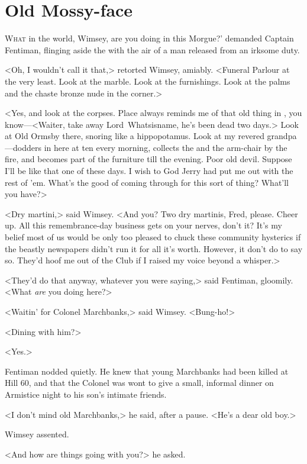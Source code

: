 \chapter{Old Mossy-face}
\lettrine[ante=‘]{W}{hat} in the world, Wimsey, are you doing in this  Morgue?' demanded Captain Fentiman, flinging aside the  with the air of a man released from an irksome duty.

\zz
<Oh, I wouldn't call it that,> retorted Wimsey, amiably. <Funeral Parlour at the very least. Look at the marble. Look at the furnishings. Look at the palms and the chaste bronze nude in the corner.>

<Yes, and look at the corpses. Place always reminds me of that old thing in , you know—<Waiter, take away Lord~Whatsisname, he's been dead two days.> Look at Old Ormsby there, snoring like a hippopotamus. Look at my revered grandpa—dodders in here at ten every morning, collects the  and the arm-chair by the fire, and becomes part of the furniture till the evening. Poor old devil. Suppose I'll be like that one of these days. I wish to God Jerry had put me out with the rest of 'em. What's the good of coming through for this sort of thing? What'll you have?>

<Dry martini,> said Wimsey. <And you? Two dry martinis, Fred, please. Cheer up. All this remembrance-day business gets on your nerves, don't it? It's my belief most of us would be only too pleased to chuck these community hysterics if the beastly newspapers didn't run it for all it's worth. However, it don't do to say so. They'd hoof me out of the Club if I raised my voice beyond a whisper.>

<They'd do that anyway, whatever you were saying,> said Fentiman, gloomily. <What \emph{are} you doing here?>

<Waitin' for Colonel Marchbanks,> said Wimsey. <Bung-ho!>

<Dining with him?>

<Yes.>

Fentiman nodded quietly. He knew that young Marchbanks had been killed at Hill 60, and that the Colonel was wont to give a small, informal dinner on Armistice night to his son's intimate friends.

<I don't mind old Marchbanks,> he said, after a pause. <He's a dear old boy.>

Wimsey assented.

<And how are things going with you?> he asked.

